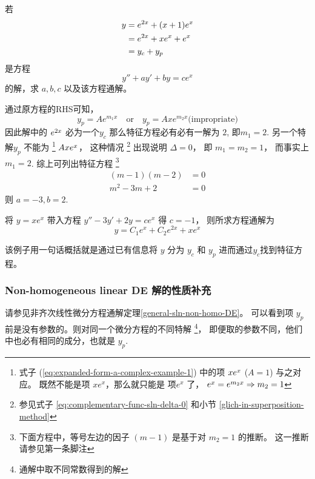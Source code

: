 \begin{example}
    若 
    \begin{align}
        \notag y &= e^{2x} + (x+1) e^x \\
        \label{eq:expanded-form-a-complex-example-1} &= e^{2x} + x e^x + e^x \\
        \notag   &= y_c + y_p
    \end{align}
    是方程 
    \[
        y'' + ay' + by = ce^{x}
    \]
    的解，求 $a, b, c$ 以及该方程通解。

    \cite[page 145, pdf 156]{we}
    
    通过原方程的RHS可知，
    \[
        y_p = Ae^{m_1x} 
        \quad \mbox{or} \quad 
        y_p = Axe^{m_2x} \mbox{(impropriate)}
    \]
    因此解中的 $\cramped{e^{2x}}$ 必为一个$y_c$ 
    那么特征方程必有必有一解为 $2$, 即$m_1 = 2$.
    另一个特解$y_p$ 不能为
    \footnote{
        式子 (\ref{eq:expanded-form-a-complex-example-1}) 
        中的项 $\cramped{xe^x}$ ($A = 1$) 与之对应。
        既然不能是项 $xe^x$，那么就只能是 项$e^x$ 了，
        $\cramped{e^x = e^{m_2x} \Rightarrow m_2 = 1}$
    }
    $\cramped{Axe^x}$，
    这种情况
    \footnote{
        参见式子
        \ref{eq:complementary-func-sln-delta-0}
        和小节
        \ref{glich-in-superposition-method}
    }
    出现说明 $\Delta = 0$，
    即 $m_1 = m_2 = 1$，
    而事实上$m_1 = 2$.
    综上可列出特征方程
    \footnote{
        下面方程中，等号左边的因子 $(m - 1)$ 
        是基于对 $m_2 = 1$ 的推断。
        这一推断请参见第一条脚注
    }
    \begin{align*}
        (m-1)(m-2) &= 0\\
        m^2 - 3m + 2 &= 0
    \end{align*}
    则 $a = -3, b = 2$.

    将 $y = xe^x$ 带入方程 $y'' - 3y' + 2y = ce^x$ 得 $c = -1$，
    则所求方程通解为
    \[
        y = C_1 e^x + C_2 e^{2x} + xe^x
    \]
\end{example}
该例子用一句话概括就是通过已有信息将 $y$ 分为 $y_c$ 和 $y_p$
进而通过$y_c$找到特征方程。

\subsubsection{Non-homogeneous linear DE 解的性质补充}

请参见非齐次线性微分方程通解定理\ref{general-sln-non-homo-DE}。
可以看到项 $y_p$ 前是没有参数的。则对同一个微分方程的不同特解
\footnote{通解中取不同常数得到的解}，
即便取的参数不同，他们中也必有相同的成分，也就是
$y_p$.

